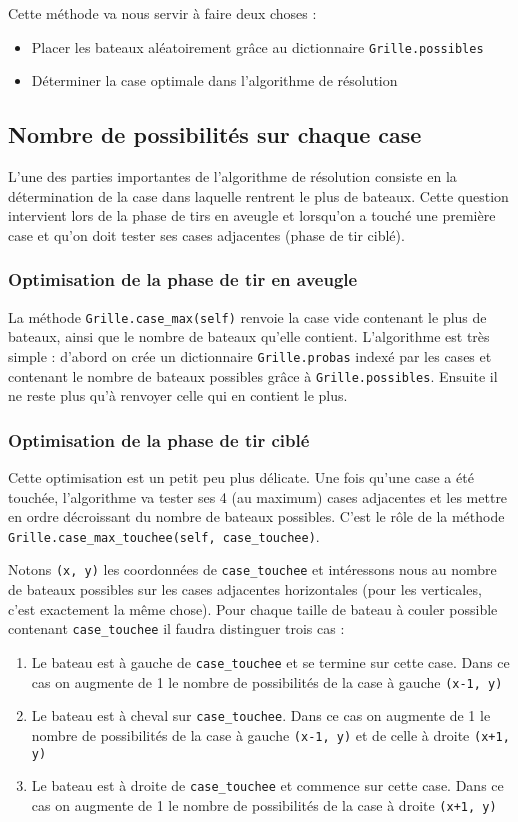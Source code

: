 Cette méthode va nous servir à faire deux choses :
\begin{itemize}
\item Placer les bateaux aléatoirement grâce au dictionnaire \texttt{Grille.possibles}
\item Déterminer la case optimale dans l'algorithme de résolution
\end{itemize}

\subsection{Nombre de possibilités sur chaque case}
L'une des parties importantes de l'algorithme de résolution consiste en la détermination de la case dans laquelle rentrent le plus de bateaux. Cette question intervient lors de la phase de tirs en aveugle et lorsqu'on a touché une première case et qu'on doit tester ses cases adjacentes (phase de tir ciblé).
\subsubsection{Optimisation de la phase de tir en aveugle}\label{opti_aveugle}
La méthode \texttt{Grille.case\_max(self)} renvoie la case vide contenant le plus de bateaux, ainsi que le nombre de bateaux qu'elle contient. L'algorithme est très simple : d'abord on crée un dictionnaire \texttt{Grille.probas} indexé par les cases et contenant le nombre de bateaux possibles grâce à \texttt{Grille.possibles}. Ensuite il ne reste plus qu'à renvoyer celle qui en contient le plus.

\subsubsection{Optimisation de la phase de tir ciblé}\label{opti_touche}
Cette optimisation est un petit peu plus délicate. Une fois qu'une case a été touchée, l'algorithme va tester ses 4 (au maximum) cases adjacentes et les mettre en ordre décroissant du nombre de bateaux possibles. C'est le rôle de la méthode \texttt{Grille.case\_max\_touchee(self, case\_touchee)}. 

Notons \texttt{(x, y)} les coordonnées de \texttt{case\_touchee} et intéressons nous au nombre de bateaux possibles sur les cases adjacentes horizontales (pour les verticales, c'est exactement la même chose). Pour chaque taille de bateau à couler possible contenant \texttt{case\_touchee} il faudra distinguer trois cas :
\begin{enumerate}
\item Le bateau est à gauche de \texttt{case\_touchee} et se termine sur cette case. Dans ce cas on augmente de 1 le nombre de possibilités de la case à gauche \texttt{(x-1, y)}
\item Le bateau est à cheval sur \texttt{case\_touchee}. Dans ce cas on augmente de 1 le nombre de possibilités de la case à gauche \texttt{(x-1, y)} et de celle à droite \texttt{(x+1, y)}
\item Le bateau est à droite de \texttt{case\_touchee} et commence sur cette case. Dans ce cas on augmente de 1 le nombre de possibilités de la case à droite \texttt{(x+1, y)}
\end{enumerate}

